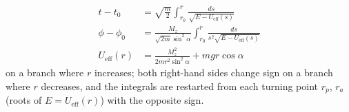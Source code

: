 \begin{problem}[title={Particle on the surface of a vertical cone}]
{}
{
\begin{align*}
  t - t_0 &=  \sqrt{\frac{m}{2}} \int_{r_0}^{r} \frac{ds}{\sqrt{E-U_{\text{eff}}(s)}} \\
  \phi - \phi_0 &= \frac{M_z}{\sqrt{2m}\sin^2{\alpha}} \int_{r_0}^{r} \frac{ds}{s^2\sqrt{E-U_{\text{eff}}(s)}} \\
  U_{\text{eff}}(r) &= \frac{M_z^2}{2mr^2\sin^2{\alpha}} + mgr\cos{\alpha}
\end{align*}
on a branch where $r$ increases; both right-hand sides change sign on a branch where $r$ decreases, and the integrals are restarted from each turning point $r_p$, $r_a$ (roots of $E = U_{\text{eff}}(r)$) with the opposite sign.
}
\end{problem}


